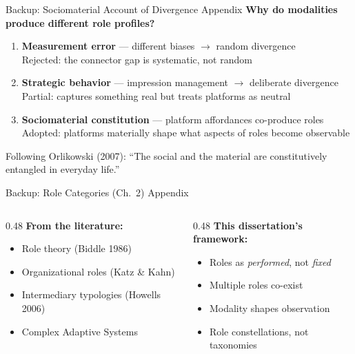 \documentclass[aspectratio=169]{beamer}
\newcommand{\secmark}[1]{\hfill{\scriptsize\color{gray}#1}}
\begin{document}
\begin{frame}{Backup: Sociomaterial Account of Divergence}
\secmark{Appendix}
\textbf{Why do modalities produce different role profiles?}
\vspace{0.5em}
\begin{enumerate}
    \item \textbf{Measurement error} --- different biases $\to$ random divergence\\
        {\small\color{gray} Rejected: the connector gap is systematic, not random}
    \item \textbf{Strategic behavior} --- impression management $\to$ deliberate divergence\\
        {\small\color{gray} Partial: captures something real but treats platforms as neutral}
    \item \textbf{Sociomaterial constitution} --- platform affordances co-produce roles\\
        {\small\color{gray} Adopted: platforms materially shape what aspects of roles become observable}
\end{enumerate}
\vspace{0.5em}
Following Orlikowski (2007): ``The social and the material are constitutively entangled in everyday life.''
\end{frame}

\begin{frame}{Backup: Role Categories (Ch.~2)}
\secmark{Appendix}
\begin{columns}[T]
\begin{column}{0.48\textwidth}
    \textbf{From the literature:}
    \begin{itemize}
        \item Role theory (Biddle 1986)
        \item Organizational roles (Katz \& Kahn)
        \item Intermediary typologies (Howells 2006)
        \item Complex Adaptive Systems
    \end{itemize}
\end{column}
\begin{column}{0.48\textwidth}
    \textbf{This dissertation's framework:}
    \begin{itemize}
        \item Roles as \emph{performed}, not \emph{fixed}
        \item Multiple roles co-exist
        \item Modality shapes observation
        \item Role constellations, not taxonomies
    \end{itemize}
\end{column}
\end{columns}
\end{frame}
\end{document}
